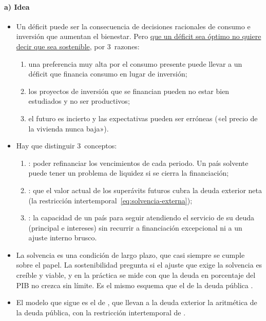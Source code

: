\documentclass[11pt]{article}
\begin{document}
\paragraph{a) Idea}

\begin{itemize}
\item Un déficit puede ser la consecuencia de decisiones racionales de consumo e inversión que aumentan el bienestar. Pero \uline{que un déficit sea óptimo no quiere decir que sea sostenible}, por 3~razones:
  \begin{enumerate}
  \item una preferencia muy alta por el consumo presente puede llevar a un déficit que financia consumo en lugar de inversión;
  \item los proyectos de inversión que se financian pueden no estar bien estudiados y no ser productivos;
  \item el futuro es incierto y las expectativas pueden ser erróneas («el precio de la vivienda nunca baja»).
  \end{enumerate}
\item Hay que distinguir 3~conceptos\nocite{MilesiFerrettiRazin1996}:
  \begin{enumerate}
  \item {}: poder refinanciar los vencimientos de cada periodo. Un país solvente puede tener un problema de liquidez si se cierra la financiación;
  \item {}: que el valor actual de los superávits futuros cubra la deuda exterior neta (la restricción intertemporal~\eqref{eq:solvencia-externa});
  \item {}: la capacidad de un país para seguir atendiendo el servicio de su deuda (principal e intereses) sin recurrir a financiación excepcional ni a un ajuste interno brusco\nocite{FMI2002Sustainability}.
  \end{enumerate}
\item La solvencia es una condición de largo plazo, que casi siempre se cumple sobre el papel. La sostenibilidad pregunta si el ajuste que exige la solvencia es creíble y viable, y en la práctica se mide con que la deuda en porcentaje del PIB no crezca sin límite. Es el mismo esquema que el de la deuda pública .
\item El modelo que sigue es el de \textcite{MilesiFerrettiRazin1996}, que llevan a la deuda exterior la aritmética de la deuda pública, con la restricción intertemporal de \textcite[cap.~2]{ObstfeldRogoff1996Foundations}.
\end{itemize}
\end{document}
